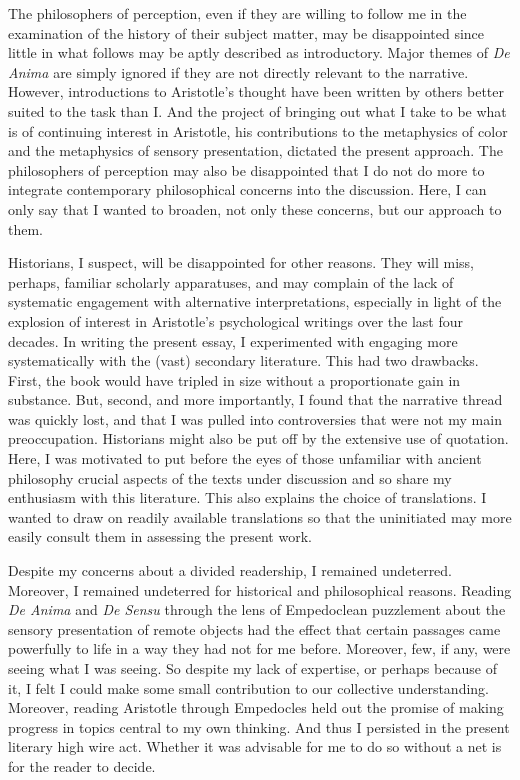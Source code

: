 The philosophers of perception, even if they are willing to follow me in the examination of the history of their subject matter, may be disappointed since little in what follows may be aptly described as introductory. Major themes of \emph{De Anima} are simply ignored if they are not directly relevant to the narrative. However, introductions to Aristotle's thought have been written by others better suited to the task than I. And the project of bringing out what I take to be what is of continuing interest in Aristotle, his contributions to the metaphysics of color and the metaphysics of sensory presentation, dictated the present approach. The philosophers of perception may also be disappointed that I do not do more to integrate contemporary philosophical concerns into the discussion. Here, I can only say that I wanted to broaden, not only these concerns, but our approach to them.

Historians, I suspect, will be disappointed for other reasons. They will miss, perhaps, familiar scholarly apparatuses, and may complain of the lack of systematic engagement with alternative interpretations, especially in light of the explosion of interest in Aristotle's psychological writings over the last four decades. In writing the present essay, I experimented with engaging more systematically with the (vast) secondary literature. This had two drawbacks. First, the book would have tripled in size without a proportionate gain in substance. But, second, and more importantly, I found that the narrative thread was quickly lost, and that I was pulled into controversies that were not my main preoccupation. Historians might also be put off by the extensive use of quotation. Here, I was motivated to put before the eyes of those unfamiliar with ancient philosophy crucial aspects of the texts under discussion and so share my enthusiasm with this literature. This also explains the choice of translations. I wanted to draw on readily available translations so that the uninitiated may more easily consult them in assessing the present work.

Despite my concerns about a divided readership, I remained undeterred. Moreover, I remained undeterred for historical and philosophical reasons. Reading \emph{De Anima} and \emph{De Sensu} through the lens of Empedoclean puzzlement about the sensory presentation of remote objects had the effect that certain passages came powerfully to life in a way they had not for me before. Moreover, few, if any, were seeing what I was seeing. So despite my lack of expertise, or perhaps because of it, I felt I could make some small contribution to our collective understanding. Moreover, reading Aristotle through Empedocles held out the promise of making progress in topics central to my own thinking. And thus I persisted in the present literary high wire act. Whether it was advisable for me to do so without a net is for the reader to decide.

